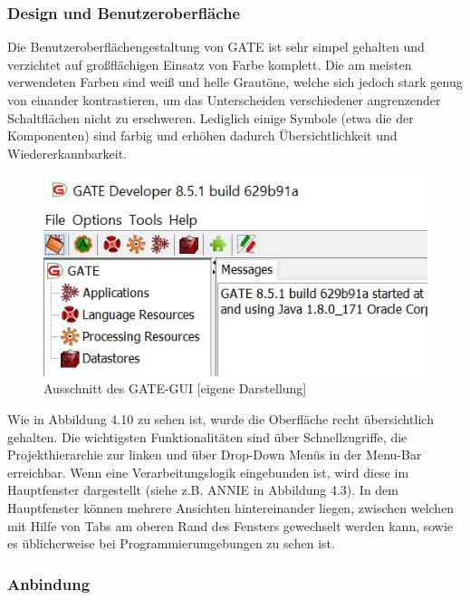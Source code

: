 \documentclass[12pt]{report}
\begin{document}
\subsubsection{Design und Benutzeroberfläche}

Die Benutzeroberflächengestaltung von GATE ist sehr simpel gehalten und verzichtet auf großflächigen Einsatz von Farbe komplett. Die am meisten verwendeten Farben sind weiß und helle Grautöne, welche sich jedoch stark genug von einander kontrastieren, um das Unterscheiden verschiedener angrenzender Schaltflächen nicht zu erschweren. Lediglich einige Symbole (etwa die der Komponenten) sind farbig und erhöhen dadurch Übersichtlichkeit und Wiedererkannbarkeit. 

\begin{figure}[h!]
\begin{center}
\includegraphics[scale=1]{GATE_Bilder/GUI-Ausschnitt.jpg}
\caption{Ausschnitt des GATE-GUI [eigene Darstellung]}
\end{center}
\end{figure}

Wie in Abbildung 4.10 zu sehen ist, wurde die Oberfläche recht übersichtlich gehalten. Die wichtigsten Funktionalitäten sind über Schnellzugriffe, die Projekthierarchie zur linken und über Drop-Down Menüs in der Menu-Bar erreichbar. Wenn eine Verarbeitungslogik eingebunden ist, wird diese im Hauptfenster dargestellt (siehe z.B. ANNIE in Abbildung 4.3). In dem Hauptfenster können mehrere Ansichten hintereinander liegen, zwischen welchen mit Hilfe von Tabs am oberen Rand des Fensters gewechselt werden kann, sowie es üblicherweise bei Programmierumgebungen zu sehen ist. 

\subsubsection{Anbindung}
\end{document}
